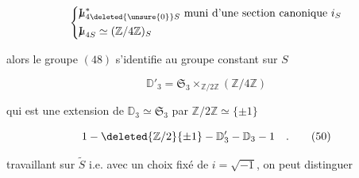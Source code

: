 \[
\left\{\begin{aligned}
&\mathord{\mathrm{I}\mkern-7mu\mu}_{4\deleted{\unsure{0}}S}^*\ \text{muni d'une section canonique }i_S\\
&\mathord{\mathrm{I}\mkern-7mu\mu}_{4S}\simeq(\mathbb Z/4\mathbb Z)_S
\end{aligned}\right.
\]

alors le groupe $(48)$ s'identifie au groupe constant sur $S$  

\[
\mathbb D'_3=\mathfrak S_3\times_{\mathbb Z/2\mathbb Z}(\mathbb Z/4\mathbb Z)
\tag*{(49)}
\]

qui est une extension de $\mathbb D_3\simeq \mathfrak S_3$ par $\mathbb Z/2\mathbb Z\simeq\{\pm1\}$

\[
1\mathbin{\relbar}\deleted{\mathbb Z/2}\{\pm1\}\mathbin{\relbar}\mathbb D'_3\mathbin{\relbar}\mathbb D_3\mathbin{\relbar}1\quad .
\tag*{(50)}
\]

   travaillant sur $\widetilde S$ i.e. avec un choix fixé de $i=\sqrt{-1}$, on peut distinguer

